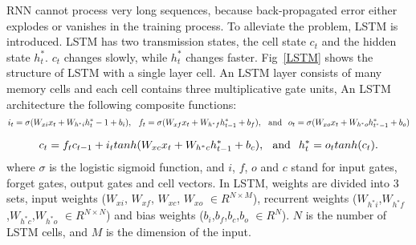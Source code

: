 RNN cannot process very long sequences, because  back-propagated error  either explodes or vanishes  in the training process.  To alleviate the problem, 
LSTM is introduced. 
LSTM has two transmission states, the  cell state $c_t$  and the hidden state $h^*_t$. $c_t$  changes slowly, while $h^*_t$ changes faster. 
Fig~\ref{LSTM} shows the structure of LSTM with a single layer cell.  
An LSTM layer  consists of many 
memory cells and each cell contains three multiplicative gate units,  An LSTM architecture  the following composite functions:
\begin{equation}
    i_t = \sigma(W_{xi}x_t + W_{h^*i}h^*_t-1 + b_i), \hspace{0.1in}  f_t = \sigma(W_{xf}x_t + W_{h^*f}h^*_{t-1} + b_f), \hspace{0.1in} \mbox{and}  \hspace{0.1in} o_t = \sigma(W_{xo}x_t + W_{h^*o}h^*_{t^*-1}+b_o)
\end{equation}


\begin{equation}
    c_t = f_tc_{t-1} + i_ttanh(W_{xc}x_t + W_{h^*c}h^*_{t-1}+b_c), \hspace{0.1in} \mbox{and}  \hspace{0.1in}  h^*_t = o_ttanh(c_t). 
\end{equation}
where $\sigma$ is the logistic sigmoid function, and $i$, $f$, $o$ and $c$ stand for input gates, forget gates, output gates and cell vectors. In LSTM, weights are divided into 3 sets, input weights ($W_{xi}$, $W_{xf}$, $W_{xc}$, $W_{xo}$ $\in{R^{N \times M}}$), recurrent weights ($W_{h^*i}$,$W_{h^*f}$ ,$W_{h^*c}$,$W_{h^*o}$ $\in{R^{N \times N}}$) and bias weights ($b_i$,$b_f$,$b_c$,$b_o$ $\in{R^N}$).  $N$ is the number of LSTM cells, and $M$ is the dimension of the input.
